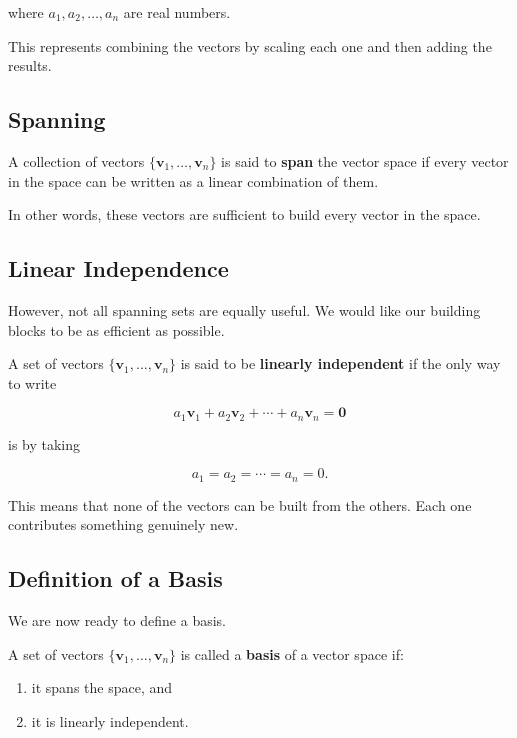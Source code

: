 \documentclass[11pt,openany]{book}
\theoremstyle{definition}
\begin{document}
where $a_1, a_2, \dots, a_n$ are real numbers.

This represents combining the vectors by scaling each one and then adding the results.

\medskip

\subsection{Spanning}

A collection of vectors $\{\mathbf{v}_1, \dots, \mathbf{v}_n\}$ is said to \textbf{span} the vector space 
if every vector in the space can be written as a linear combination of them.

In other words, these vectors are sufficient to build every vector in the space.

\medskip

\subsection{Linear Independence}

However, not all spanning sets are equally useful. 
We would like our building blocks to be as efficient as possible.

A set of vectors $\{\mathbf{v}_1, \dots, \mathbf{v}_n\}$ is said to be \textbf{linearly independent} 
if the only way to write

\[
a_1 \mathbf{v}_1 + a_2 \mathbf{v}_2 + \cdots + a_n \mathbf{v}_n = \mathbf{0}
\]

is by taking

\[
a_1 = a_2 = \cdots = a_n = 0.
\]

This means that none of the vectors can be built from the others. 
Each one contributes something genuinely new.

\medskip

\subsection{Definition of a Basis}

We are now ready to define a basis.

A set of vectors $\{\mathbf{v}_1, \dots, \mathbf{v}_n\}$ is called a \textbf{basis} of a vector space if:

\begin{enumerate}
  \item it spans the space, and
  \item it is linearly independent.
\end{enumerate}
\end{document}

